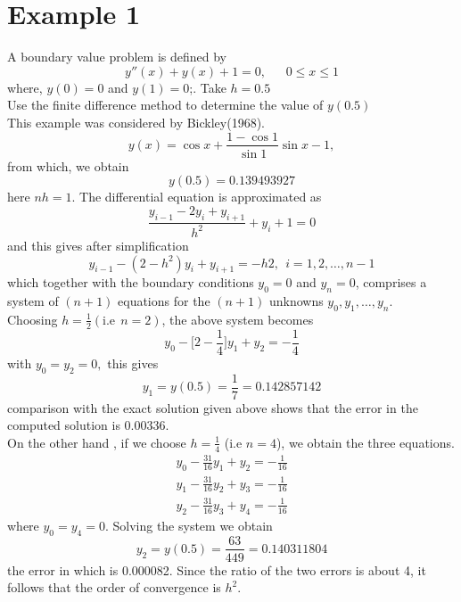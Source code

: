 \documentclass[12pt]{report}
\newcommand{\sps}{\\[0.2cm]}
\newcommand{\NI}{\noindent}
\newcommand{\dprime}{''}
\begin{document}
	\section*{Example 1}
	A boundary value problem is defined by 
	\begin{equation*}
		y\dprime(x) + y(x) + 1 = 0, ~~~~~~~ 0 \leq x \leq 1
	\end{equation*}
	where, $y(0)=0$ and $y(1)=0$;. Take $h=0.5$\sps
	Use the finite difference method to determine the value of $y(0.5)$\sps
	This example was considered by Bickley(1968).
	\begin{equation}
			y(x) = \cos x + \frac{1-\cos 1}{\sin 1}\sin x - 1,
	\end{equation}
	from which, we obtain
	$$
		y(0.5) = 0.139493927
	$$
	here $nh=1$. The differential equation is approximated as
	\begin{equation}
		\frac{y_{i-1} - 2y_i + y_{i+1}}{h^2} + y_i + 1 = 0
	\end{equation}
	and this gives after simplification
	\begin{equation}
		y_{i-1} - (2-h^2)y_i + y_{i+1} = -h2, ~~ i=1,2,\ldots, n-1
	\end{equation}
	which together with the boundary conditions $y_0=0$ and $y_n=0$, comprises a system of $(n+1)$ equations for the $(n+1)$ unknowns $y_0, y_1,\ldots, y_n$.\sps
	Choosing $h=\frac{1}{2} (\text{i.e} ~~ n=2)$, the above system becomes
	\begin{equation*}
		y_0 - \Big[2 - \frac{1}{4}\Big]y_1 + y_2 = -\frac{1}{4}
	\end{equation*}
	with $y_0=y_2 = 0,$ this gives
	\begin{equation*}
		y_1 = y(0.5) = \frac{1}{7} = 0.142857142
	\end{equation*}
	comparison with the exact solution given above shows that the error in the computed solution is 0.00336.\sps
	
	\NI On the other hand , if we choose $h=\frac{1}{4}$ (i.e $n=4$), we obtain the three equations.
	\begin{equation*}
		\begin{array}{l}
			y_0 - \frac{31}{16}y_1 + y_2 = -\frac{1}{16}\sps
			y_1 - \frac{31}{16}y_2 + y_3 = -\frac{1}{16}\sps
			y_2 - \frac{31}{16}y_3 + y_4 = -\frac{1}{16}
		\end{array}
	\end{equation*}
	where $y_0=y_4 =0$. Solving the system we obtain
	\begin{equation*}
		y_2 = y(0.5) = \frac{63}{449} = 0.140311804
	\end{equation*}
	the error in which is 0.000082. Since the ratio of the two errors is about 4, it follows that the order of convergence is $h^2$.\\
	
\end{document}
